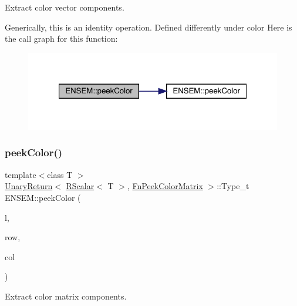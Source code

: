 Extract color vector components. 

Generically, this is an identity operation. Defined differently under color Here is the call graph for this function\+:\nopagebreak
\begin{figure}[H]
\begin{center}
\leavevmode
\includegraphics[width=321pt]{d9/ded/group__rscalar_ga9ab62185b545eeb3c9cad28b0c200430_cgraph}
\end{center}
\end{figure}
\mbox{\label{group__rscalar_ga692303fb1e668f95b9363df896b04842}} 
\subsubsection{\texorpdfstring{peekColor()}{peekColor()}\hspace{0.1cm}{\footnotesize\ttfamily [2/2]}}
{\footnotesize\ttfamily template$<$class T $>$ \\
\mbox{\hyperlink{structENSEM_1_1UnaryReturn}{Unary\+Return}}$<$ \mbox{\hyperlink{classENSEM_1_1RScalar}{R\+Scalar}}$<$ T $>$, \mbox{\hyperlink{structENSEM_1_1FnPeekColorMatrix}{Fn\+Peek\+Color\+Matrix}} $>$\+::Type\+\_\+t E\+N\+S\+E\+M\+::peek\+Color (\begin{DoxyParamCaption}\item[{const \mbox{\hyperlink{classENSEM_1_1RScalar}{R\+Scalar}}$<$ T $>$ \&}]{l,  }\item[{int}]{row,  }\item[{int}]{col }\end{DoxyParamCaption})\hspace{0.3cm}{\ttfamily [inline]}}



Extract color matrix components. 

